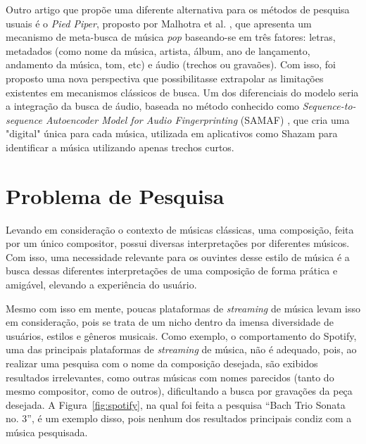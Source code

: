 \documentclass[12pt]{article}
\begin{document}
Outro artigo que propõe uma diferente alternativa para os métodos de pesquisa
usuais é o \emph{Pied Piper}, proposto por Malhotra et al. \cite{MaRa:22},
que apresenta um mecanismo de meta-busca de música \emph{pop} baseando-se em
três fatores: letras, metadados (como nome da música, artista, álbum, ano de
lançamento, andamento da música, tom, etc) e áudio (trechos ou gravaões). Com
isso, foi proposto uma nova perspectiva que possibilitasse extrapolar as
limitações existentes em mecanismos clássicos de busca. Um dos diferenciais do
modelo seria a integração da busca de áudio, baseada no método conhecido como
\emph{Sequence-to-sequence Autoencoder Model for Audio Fingerprinting} (SAMAF)
\cite{Ba+:20}, que cria uma "digital" única para cada música, utilizada
em aplicativos como Shazam para identificar a música utilizando apenas trechos
curtos.

\section{Problema de Pesquisa} \label{sec:problem}

Levando em consideração o contexto de músicas clássicas, uma composição, feita
por um único compositor, possui diversas interpretações por diferentes músicos.
Com isso, uma necessidade relevante para os ouvintes desse estilo de música é a
busca dessas diferentes interpretações de uma composição de forma prática e
amigável, elevando a experiência do usuário.

Mesmo com isso em mente, poucas plataformas de \emph{streaming} de música levam
isso em consideração, pois se trata de um nicho dentro da imensa diversidade de
usuários, estilos e gêneros musicais. Como exemplo, o comportamento do Spotify,
uma das principais plataformas de \emph{streaming} de música, não é adequado,
pois, ao realizar uma pesquisa com o nome da composição desejada, são exibidos
resultados irrelevantes, como outras músicas com nomes parecidos (tanto do mesmo
compositor, como de outros), dificultando a busca por gravações da peça
desejada. A Figura~\ref{fig:spotify}, na qual foi feita a pesquisa ``Bach Trio
Sonata no. 3'', é um exemplo disso, pois nenhum dos resultados principais condiz
com a música pesquisada.
\end{document}
